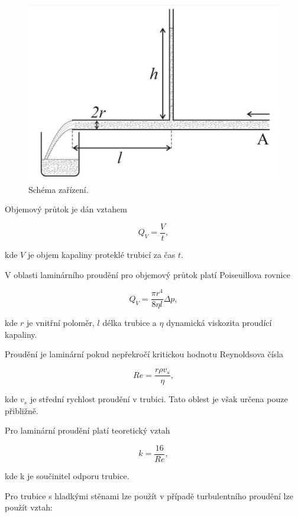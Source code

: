     \begin{figure}[h]
        \centering
        \includegraphics[width=0.5\linewidth]{01 - Studium proudění viskózní kapaliny trubicemi kruhového průřezu//Protokol//img/Schéma.png}
        \caption{Schéma zařízení.}
        \label{fig:schema}
    \end{figure}

    Objemový průtok je dán vztahem

    \begin{equation}
        Q_V = \frac{V}{t},
    \end{equation}

    kde \(V\) je objem kapaliny proteklé trubicí za čas \(t\).

    V oblasti laminárního proudění pro objemový průtok platí Poiseuillova rovnice

    \begin{equation}
        Q_V = \frac{\pi r^4}{8\eta l}\Delta p,
    \end{equation}

    kde \(r\) je vnitřní poloměr, \(l\) délka trubice a \(\eta\) dynamická viskozita proudící kapaliny.

    Proudění je laminární pokud nepřekročí kritickou hodnotu Reynoldsova čísla

    \begin{equation}
        Re = \frac{r\rho v_s}{\eta},
    \end{equation}

    kde \(v_s\) je střední rychlost proudění v trubici. Tato oblest je však určena pouze přibližně.

    Pro laminární proudění platí teoretický vztah

    \begin{equation}
        k = \frac{16}{Re},
    \end{equation}

    kde k je součinitel odporu trubice.

    Pro trubice s hladkými stěnami lze použít v případě turbulentního proudění lze použít vztah:

